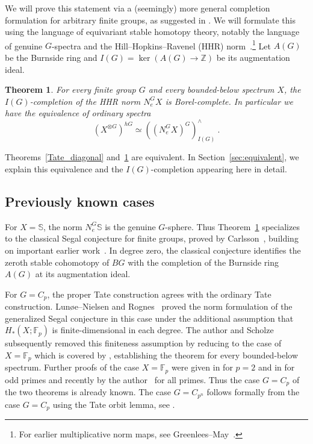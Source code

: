 \documentclass[11pt,a4paper]{article}
\newtheorem{thm}{Theorem}[section]
\theoremstyle{definition}
\newcommand{\Sph}{\mathbb S}
\newcommand{\Fp}{\mathbb F_p}
\newcommand{\NormG}{N_e^G}
\begin{document}
We will prove this statement via a (seemingly) more general completion formulation for arbitrary finite groups, as
suggested in \cite[Remark 7.11]{Nik}. We will formulate this using the language of equivariant stable homotopy theory, notably the language of genuine $G$-spectra and the Hill--Hopkins--Ravenel (HHR) norm~\cite[\S2.2.3]{HHR}.\footnote{For earlier multiplicative norm maps, see Greenlees--May~\cite[\S\S4--7]{GM}.} 
Let $A(G)$ be the Burnside ring and 
$I(G)=\ker(A(G)\to\mathbb Z)$ be its augmentation ideal.

\begin{thm}\label{thm:main}
For every finite group $G$ and every bounded-below spectrum $X$, the
$I(G)$-completion of the HHR norm $\NormG X$ is Borel-complete. In particular we have the equivalence of ordinary spectra
\[
(X^{\otimes G})^{hG} \simeq \left ((\NormG X)^G\right)^\wedge_{I(G)} \ .
\]
\end{thm}

Theorems~\ref{Tate_diagonal} and~\ref{thm:main} are equivalent.
In Section~\ref{sec:equivalent}, we explain this equivalence
and the $I(G)$-completion appearing here in detail.

\subsection*{Previously known cases}

For $X=\Sph$, the norm $\NormG\Sph$ is the genuine $G$-sphere.
Thus Theorem~\ref{thm:main} specializes to the classical Segal conjecture
for finite groups, proved by Carlsson~\cite{Car},
building on important earlier work~\cite{Lin,Gun,AGM,MM}.
In degree zero, the classical conjecture identifies the zeroth stable cohomotopy
of $BG$ with the completion of the Burnside ring $A(G)$ at its augmentation ideal.

For $G=C_p$, the proper Tate construction agrees with the ordinary Tate
construction. Lun\o e--Nielsen and Rognes~\cite[Theorem 5.13]{LNR} proved the
norm formulation of the generalized Segal conjecture in this case under the additional assumption that
$H_*(X;\Fp)$ is finite-dimensional in each degree.
The author and Scholze~\cite[Theorem III.1.7]{NS} subsequently removed this
finiteness assumption by reducing to the case of $X = \Fp$ which is covered by \cite{LNR}, establishing the theorem for every
bounded-below spectrum. Further proofs of the case $X=\Fp$ were given in
\cite{HW,Carrick} for $p=2$ and in \cite{AKZ} for odd primes and recently  by the author~\cite{NikSegal} for all primes. Thus the case $G = C_p$ of the two theorems is already known. 
The case $G=C_{p^n}$ follows formally from the case
$G=C_p$ using the Tate orbit lemma, see
\cite[discussion following Conjecture~7.10]{Nik}.
\end{document}
